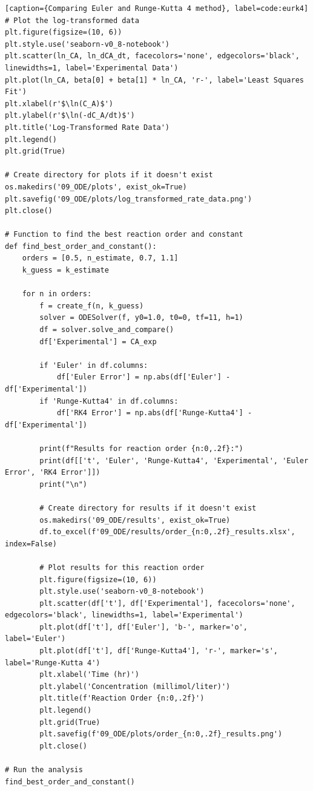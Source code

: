 \documentclass[10pt]{article}
\begin{document}
\begin{lstlisting}[style=custompython][caption={Comparing Euler and Runge-Kutta 4 method}, label=code:eurk4]
# Plot the log-transformed data
plt.figure(figsize=(10, 6))
plt.style.use('seaborn-v0_8-notebook')
plt.scatter(ln_CA, ln_dCA_dt, facecolors='none', edgecolors='black', linewidths=1, label='Experimental Data')
plt.plot(ln_CA, beta[0] + beta[1] * ln_CA, 'r-', label='Least Squares Fit')
plt.xlabel(r'$\ln(C_A)$')
plt.ylabel(r'$\ln(-dC_A/dt)$')
plt.title('Log-Transformed Rate Data')
plt.legend()
plt.grid(True)

# Create directory for plots if it doesn't exist
os.makedirs('09_ODE/plots', exist_ok=True)
plt.savefig('09_ODE/plots/log_transformed_rate_data.png')
plt.close()

# Function to find the best reaction order and constant
def find_best_order_and_constant():
    orders = [0.5, n_estimate, 0.7, 1.1]
    k_guess = k_estimate

    for n in orders:
        f = create_f(n, k_guess)
        solver = ODESolver(f, y0=1.0, t0=0, tf=11, h=1)
        df = solver.solve_and_compare()
        df['Experimental'] = CA_exp

        if 'Euler' in df.columns:
            df['Euler Error'] = np.abs(df['Euler'] - df['Experimental'])
        if 'Runge-Kutta4' in df.columns:
            df['RK4 Error'] = np.abs(df['Runge-Kutta4'] - df['Experimental'])

        print(f"Results for reaction order {n:0,.2f}:")
        print(df[['t', 'Euler', 'Runge-Kutta4', 'Experimental', 'Euler Error', 'RK4 Error']])
        print("\n")

        # Create directory for results if it doesn't exist
        os.makedirs('09_ODE/results', exist_ok=True)
        df.to_excel(f'09_ODE/results/order_{n:0,.2f}_results.xlsx', index=False)

        # Plot results for this reaction order
        plt.figure(figsize=(10, 6))
        plt.style.use('seaborn-v0_8-notebook')
        plt.scatter(df['t'], df['Experimental'], facecolors='none', edgecolors='black', linewidths=1, label='Experimental')
        plt.plot(df['t'], df['Euler'], 'b-', marker='o', label='Euler')
        plt.plot(df['t'], df['Runge-Kutta4'], 'r-', marker='s', label='Runge-Kutta 4')
        plt.xlabel('Time (hr)')
        plt.ylabel('Concentration (millimol/liter)')
        plt.title(f'Reaction Order {n:0,.2f}')
        plt.legend()
        plt.grid(True)
        plt.savefig(f'09_ODE/plots/order_{n:0,.2f}_results.png')
        plt.close()

# Run the analysis
find_best_order_and_constant()
\end{lstlisting}
\end{document}
